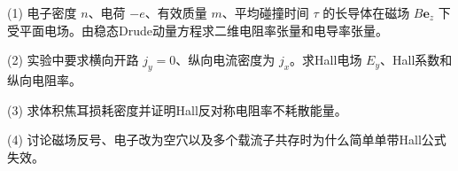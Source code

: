 (1) 电子密度 \(n\)、电荷 \(-e\)、有效质量 \(m\)、平均碰撞时间 \(\tau\) 的长导体在磁场 \(B\mathbf e_z\) 下受平面电场。由稳态Drude动量方程求二维电阻率张量和电导率张量。

(2) 实验中要求横向开路 \(j_y=0\)、纵向电流密度为 \(j_x\)。求Hall电场 \(E_y\)、Hall系数和纵向电阻率。

(3) 求体积焦耳损耗密度并证明Hall反对称电阻率不耗散能量。

(4) 讨论磁场反号、电子改为空穴以及多个载流子共存时为什么简单单带Hall公式失效。
